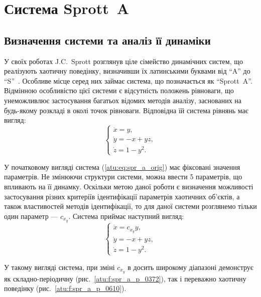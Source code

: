 
\FloatBarrier
\section{Система Sprott~A}  %
\label{atu:sect:spr_a}


\subsection{Визначення системи та аналіз її динаміки} %

У своїх роботах J.C.~Sprott розглянув ціле сімейство
динамічних систем, що реалізують хаотичну поведінку,
визначивши їх латинськими буквами від ``A'' до ``S''~\cite{sprott_212,sprott_strange_attr}.
Особливе місце серед них займає система, що позначається як ``Sprott~A''.
Відмінною особливістю цієї системи є відсутність положень рівноваги, що унеможливлює
застосування багатьох відомих методів аналізу, заснованих на будь-якому
розкладі в околі точок рівноваги.
Відповідна їй система рівнянь має вигляд:
%
\begin{equation}
  \begin{cases}
    \dot{x} =  y, \\
    \dot{y} = -x + yz, \\
    \dot{z} =  1 - y^2.
  \end{cases}
  \label{atu:eq:spr_a_orig}
\end{equation}


У початковому вигляді система (\ref{atu:eq:spr_a_orig}) має фіксовані
значення параметрів. Не змінюючи структури системи, можна
ввести 5 параметрів, що впливають на її динамку. Оскільки метою
даної роботи є визначення можливості застосування різних
критеріїв ідентифікації параметрів хаотичних об'єктів, а
також властивостей методів ідентифікації, то для даної системи
розглянемо тільки один параметр ---
$c_{x_y}$. Система приймає наступний вигляд:
%
\begin{equation}
  \begin{cases}
    \dot{x} =  c_{x_y} y, \\
    \dot{y} = -x + yz, \\
    \dot{z} =  1 - y^2.
  \end{cases}
  \label{atu:eq:spr_a}
\end{equation}

У такому вигляді система, при зміні $c_{x_y}$ в досить широкому діапазоні
демонструє як складно-періодичну (рис.~\ref{atu:f:spr_a_p_0372}),
так і переважно хаотичну поведінку (рис.~\ref{atu:f:spr_a_p_0610}).



